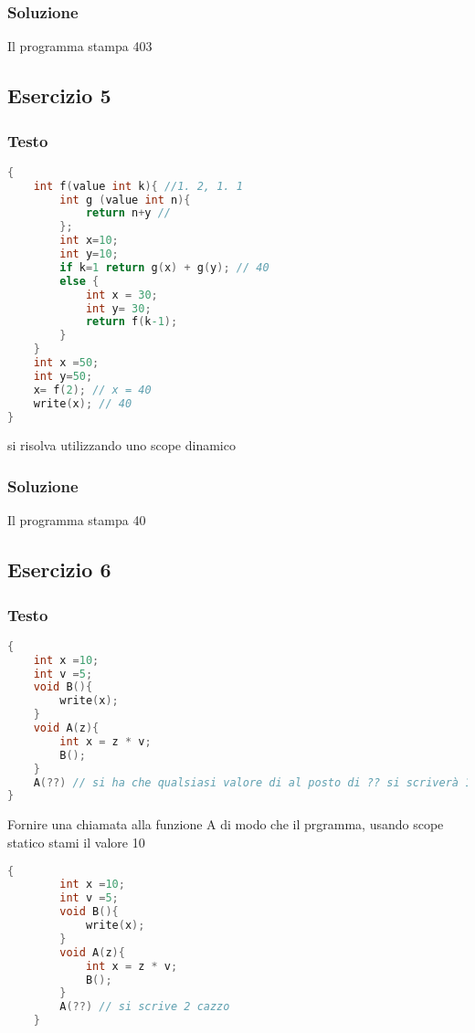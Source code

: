 \subsubsection{Soluzione}
Il programma stampa 403

\subsection{Esercizio 5}
\subsubsection{Testo}
\begin{lstlisting}[language=C]
{  
    int f(value int k){ //1. 2, 1. 1
        int g (value int n){
            return n+y //
        };
        int x=10;
        int y=10;
        if k=1 return g(x) + g(y); // 40
        else {
            int x = 30; 
            int y= 30;
            return f(k-1);
        }
    }
    int x =50;
    int y=50;
    x= f(2); // x = 40
    write(x); // 40
}
\end{lstlisting}
si risolva utilizzando uno scope dinamico

\subsubsection{Soluzione}
Il programma stampa 40

\subsection{Esercizio 6}
\subsubsection{Testo}
\begin{lstlisting}[language=C]
{
    int x =10;
    int v =5;
    void B(){
        write(x);
    }
    void A(z){
        int x = z * v;
        B();
    }
    A(??) // si ha che qualsiasi valore di al posto di ?? si scriverà 10
}
\end{lstlisting}
Fornire una chiamata alla funzione A di modo che il prgramma, usando scope statico stami il valore 10
\begin{lstlisting}[language=C]
    {
        int x =10;
        int v =5;
        void B(){
            write(x);
        }
        void A(z){
            int x = z * v;
            B();
        }
        A(??) // si scrive 2 cazzo
    }
\end{lstlisting}

